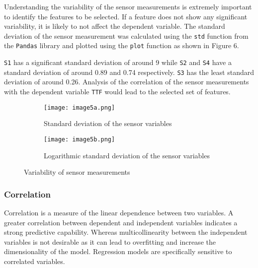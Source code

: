 \documentclass{article}
\begin{document}
Understanding the variability of the sensor measurements is extremely important to identify the features to be selected. If a feature does not show any significant variability, it is likely to not affect the dependent variable.
The standard deviation of the sensor measurement was calculated using the \texttt{std} function from the \texttt{Pandas} library and plotted using the \texttt{plot} function as shown in Figure 6.

\texttt{S1} has a significant standard deviation of around 9 while \texttt{S2} and \texttt{S4} have a standard deviation of around 0.89 and 0.74 respectively.
\texttt{S3} has the least standard deviation of around 0.26. Analysis of the correlation of the sensor measurements with the dependent variable \texttt{TTF} would lead to the selected set of features.
\begin{figure}[h]
	\begin{subfigure}{.5\textwidth}
		\centering
		\texttt{[image: image5a.png]}
		\caption{Standard deviation of the sensor variables}
		\label{fig:sfig1}
	\end{subfigure}%
	\begin{subfigure}{.5\textwidth}
		\centering
		\texttt{[image: image5b.png]}
		\caption{Logarithmic standard deviation of the sensor variables}
		\label{fig:sfig2}
	\end{subfigure}
	\caption{Variability of sensor measurements}
	\label{fig:fig}
\end{figure}

\subsubsection{Correlation}
\label{sec:corr}
Correlation is a measure of the linear dependence between two variables. A greater correlation between dependent and independent variables indicates a strong predictive capability.
Whereas multicollinearity between the independent variables is not desirable as it can lead to overfitting and increase the dimensionality of the model. Regression models are specifically sensitive to correlated variables.
\end{document}
